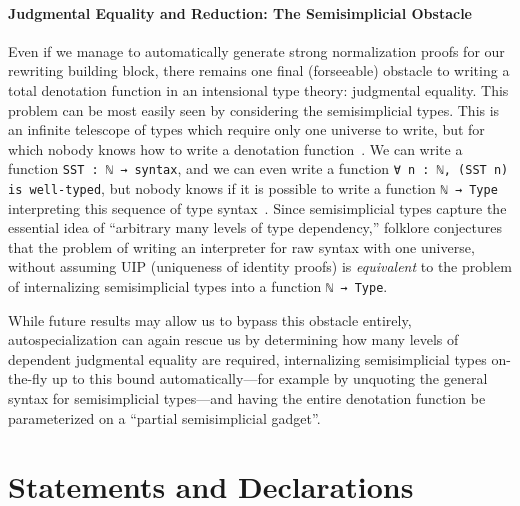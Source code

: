 \documentclass[sn-mathphys,pdflatex]{sn-jnl}%
\theoremstyle{thmstyleone}%
\theoremstyle{thmstyletwo}%
\theoremstyle{thmstylethree}%
\begin{document}
\paragraph{Judgmental Equality and Reduction: The Semisimplicial Obstacle}
Even if we manage to automatically generate strong normalization proofs for our rewriting building block, there remains one final (forseeable) obstacle to writing a total denotation function in an intensional type theory: judgmental equality.
This problem can be most easily seen by considering the semisimplicial types.
This is an infinite telescope of types which require only one universe to write, but for which nobody knows how to write a denotation function~\cite{shulman2014hott}.
We can write a function \texttt{SST : ℕ → syntax}, and we can even write a function \texttt{∀ n : ℕ, (SST n) is well-typed}, but nobody knows if it is possible to write a function \texttt{ℕ → Type} interpreting this sequence of type syntax~\cite{kolomatskaia2022semisimplicial}.
Since semisimplicial types capture the essential idea of ``arbitrary many levels of type dependency,'' folklore conjectures that the problem of writing an interpreter for raw syntax with one universe, without assuming UIP (uniqueness of identity proofs) is \emph{equivalent} to the problem of internalizing semisimplicial types into a function \texttt{ℕ → Type}.

While future results may allow us to bypass this obstacle entirely, autospecialization can again rescue us by determining how many levels of dependent judgmental equality are required, internalizing semisimplicial types on-the-fly up to this bound automatically---for example by unquoting the general syntax for semisimplicial types---and having the entire denotation function be parameterized on a ``partial semisimplicial gadget''.


\backmatter

\section*{Statements and Declarations}

\end{document}
